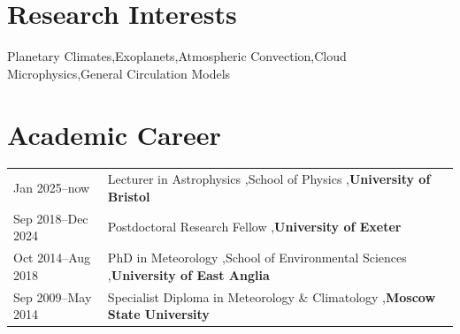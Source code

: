 \documentclass[a4paper, 11pt]{article}
\begin{document}
\thispagestyle{empty}

\keepXColumns



\section{Research Interests}
\vspace{10pt}
Planetary Climates\sep Exoplanets\sep Atmospheric Convection\sep Cloud Microphysics\sep General Circulation Models

\section{Academic Career}
\begin{tabularx}{\linewidth}{@{}l X@{}}
Jan 2025--now  & Lecturer in Astrophysics \sep School of Physics \sep \textbf{University of Bristol} \\
Sep 2018--Dec 2024 & Postdoctoral Research Fellow \sep \textbf{University of Exeter} \\
Oct 2014--Aug 2018 & PhD in Meteorology \sep School of Environmental Sciences \sep \textbf{University of East Anglia} \\
Sep 2009--May 2014 & Specialist Diploma in Meteorology \& Climatology \sep \textbf{Moscow State University}  \\
\end{tabularx}
\end{document}
